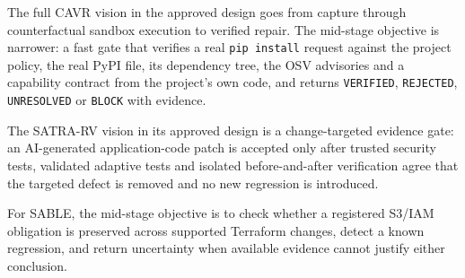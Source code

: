 \begin{sloppypar}
The full CAVR vision in the approved design goes from capture through counterfactual sandbox execution to verified repair. The mid-stage objective is narrower: a fast gate that verifies a real \texttt{pip install} request against the project policy, the real PyPI file, its dependency tree, the OSV advisories and a capability contract from the project's own code, and returns \texttt{VERIFIED}, \texttt{REJECTED}, \texttt{UNRESOLVED} or \texttt{BLOCK} with evidence.
\end{sloppypar}

\begin{sloppypar}
The SATRA-RV vision in its approved design is a change-targeted evidence gate: an AI-generated application-code patch is accepted only after trusted security tests, validated adaptive tests and isolated before-and-after verification agree that the targeted defect is removed and no new regression is introduced.
\end{sloppypar}

\begin{sloppypar}
For SABLE, the mid-stage objective is to check whether a registered S3/IAM obligation is preserved across supported Terraform changes, detect a known regression, and return uncertainty when available evidence cannot justify either conclusion.
\end{sloppypar}

